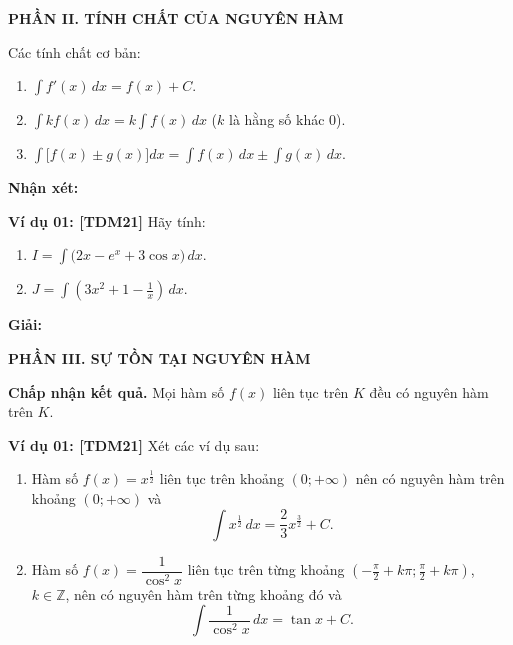 \documentclass[12pt,a4paper]{article}
\newcommand{\partheading}[1]{\par\vspace{5pt}\noindent\textbf{\textcolor{sectionpurple}{#1}}\par\vspace{1pt}}
\newcommand{\example}[2][TDM21]{\par\vspace{3pt}\noindent\textbf{\textcolor{sectionpurple}{Ví dụ #2:} \textcolor{noteborder}{[#1]}}\enspace}
\newcommand{\tightitem}{\setlength{\itemsep}{1pt}\setlength{\topsep}{1pt}\setlength{\parsep}{0pt}\setlength{\partopsep}{0pt}}
\newcommand{\loigiai}[1][7mm]{\par\noindent\textbf{\textcolor{sectionpurple}{Giải:}}\par\vspace{#1}}
\begin{document}
\clearpage
\partheading{PHẦN II. TÍNH CHẤT CỦA NGUYÊN HÀM}
Các tính chất cơ bản:
\begin{enumerate}\tightitem
 \item $\displaystyle\int f'(x)\,dx=f(x)+C$.
 \item $\displaystyle\int kf(x)\,dx=k\int f(x)\,dx$ \quad ($k$ là hằng số khác $0$).
 \item $\displaystyle\int\bigl[f(x)\pm g(x)\bigr]dx
       =\int f(x)\,dx\pm\int g(x)\,dx$.
\end{enumerate}
\textbf{Nhận xét:}\par\vspace{5mm}

\begin{notebox}
\example{01} Hãy tính:
\begin{enumerate}\tightitem
  \item $\displaystyle I=\int\bigl(2x-e^x+3\cos x\bigr)\,dx$.
  \item $\displaystyle J=\int\left(3x^2+1-\frac1x\right)\,dx$.
\end{enumerate}
\end{notebox}
\loigiai[45mm]

\partheading{PHẦN III. SỰ TỒN TẠI NGUYÊN HÀM}
\textbf{Chấp nhận kết quả.} Mọi hàm số $f(x)$ liên tục trên $K$ đều có nguyên hàm trên $K$.

\begin{notebox}
\example{01} Xét các ví dụ sau:
\begin{enumerate}\tightitem
  \item Hàm số $f(x)=x^{\frac12}$ liên tục trên khoảng $(0;+\infty)$ nên có nguyên hàm trên khoảng $(0;+\infty)$ và
  \[
    \int x^{\frac12}\,dx=\frac23x^{\frac32}+C.
  \]
  \item Hàm số $f(x)=\dfrac1{\cos^2x}$ liên tục trên từng khoảng
  $\left(-\frac\pi2+k\pi;\frac\pi2+k\pi\right)$, $k\in\mathbb Z$,
  nên có nguyên hàm trên từng khoảng đó và
  \[
     \int\frac1{\cos^2x}\,dx=\tan x+C.
  \]
\end{enumerate}
\end{notebox}
\end{document}
